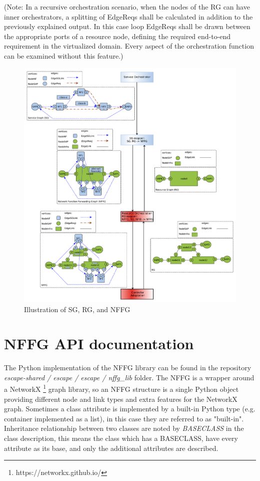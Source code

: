\documentclass[a4paper,10pt]{scrartcl}
\begin{document}
(Note: In a recursive orchestration scenario, when the nodes of the RG can have inner orchestrators, 
a splitting of EdgeReqs shall be calculated in addition to the previously explained output. 
In this case loop EdgeReqs shall be drawn between the appropriate ports of a resource node, 
defining the required end-to-end requirement in the virtualized domain. 
Every aspect of the orchestration function can be examined without this feature.)

\begin{figure}[ht!]
  \centering
  \includegraphics[width=\textwidth]{NFFG-illustration}
  \caption{Illustration of SG, RG, and NFFG}
  \label{fig:nffg-illustration}
\end{figure}


\section{NFFG API documentation}

The Python implementation of the NFFG library can be found in the repository 
\emph{escape-shared / escape / escape / nffg\_lib} folder. 
The NFFG is a wrapper around a NetworkX \footnote{https://networkx.github.io/} graph library, so an NFFG structure is a single Python object providing different node and link types and extra features for the NetworkX graph. 
Sometimes a class attribute is implemented by a built-in Python type (e.g. container implemented as a list), 
in this case they are referred to as "built-in". 
Inheritance relationship between two classes are noted by \emph{BASECLASS} in the class description,
this means the class which has a BASECLASS, have every attribute as its base, 
and only the additional attributes are described.
\end{document}
